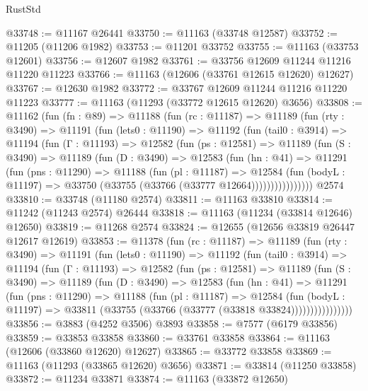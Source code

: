 \begin{lexlean}{RustStd}
\begin{coremodule}
@33748 := @11167 @26441
@33750 := @11163 (@33748 @12587)
@33752 := @11205 (@11206 @1982)
@33753 := @11201 @33752
@33755 := @11163 (@33753 @12601)
@33756 := @12607 @1982
@33761 := @33756 @12609 @11244 @11216 @11220 @11223
@33766 := @11163 (@12606 (@33761 @12615 @12620) @12627)
@33767 := @12630 @1982
@33772 := @33767 @12609 @11244 @11216 @11220 @11223
@33777 := @11163 (@11293 (@33772 @12615 @12620) @3656)
@33808 := @11162
    (fun (fn : @89) =>
    @11188
      (fun (rc : @11187) =>
      @11189
        (fun (rty : @3490) =>
        @11191
          (fun (lets0 : @11190) =>
          @11192
            (fun (tail0 : @3914) =>
            @11194
              (fun (Γ : @11193) =>
              @12582
                (fun (ps : @12581) =>
                @11189
                  (fun (S : @3490) =>
                  @11189
                    (fun (D : @3490) =>
                    @12583
                      (fun (hn : @41) =>
                      @11291
                        (fun (pns : @11290) =>
                        @11188
                          (fun (pl : @11187) =>
                          @12584
                            (fun (bodyL : @11197) =>
                            @33750 (@33755 (@33766 (@33777 @12664))))))))))))))))
    @2574
@33810 := @33748 (@11180 @2574)
@33811 := @11163 @33810
@33814 := @11242 (@11243 @2574) @26444
@33818 := @11163 (@11234 (@33814 @12646) @12650)
@33819 := @11268 @2574
@33824 := @12655 (@12656 @33819 @26447 @12617 @12619)
@33853 := @11378
    (fun (rc : @11187) =>
    @11189
      (fun (rty : @3490) =>
      @11191
        (fun (lets0 : @11190) =>
        @11192
          (fun (tail0 : @3914) =>
          @11194
            (fun (Γ : @11193) =>
            @12582
              (fun (ps : @12581) =>
              @11189
                (fun (S : @3490) =>
                @11189
                  (fun (D : @3490) =>
                  @12583
                    (fun (hn : @41) =>
                    @11291
                      (fun (pns : @11290) =>
                      @11188
                        (fun (pl : @11187) =>
                        @12584
                          (fun (bodyL : @11197) =>
                          @33811 (@33755 (@33766 (@33777 (@33818 @33824))))))))))))))))
@33856 := @3883 (@4252 @3506) @3893
@33858 := @7577 (@6179 @33856)
@33859 := @33853 @33858
@33860 := @33761 @33858
@33864 := @11163 (@12606 (@33860 @12620) @12627)
@33865 := @33772 @33858
@33869 := @11163 (@11293 (@33865 @12620) @3656)
@33871 := @33814 (@11250 @33858)
@33872 := @11234 @33871
@33874 := @11163 (@33872 @12650)

\end{coremodule}
\end{lexlean}
